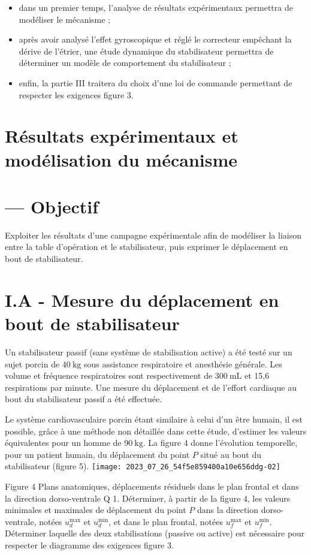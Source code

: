 \begin{itemize}
  \item dans un premier temps, l'analyse de résultats expérimentaux permettra de modéliser le mécanisme ;

  \item après avoir analysé l'effet gyroscopique et réglé le correcteur empêchant la dérive de l'étrier, une étude dynamique du stabilisateur permettra de déterminer un modèle de comportement du stabilisateur ;

  \item enfin, la partie III traitera du choix d'une loi de commande permettant de respecter les exigences figure 3.

\end{itemize}

\section{Résultats expérimentaux et modélisation du mécanisme}
\section{— Objectif}
Exploiter les résultats d'une campagne expérimentale afin de modéliser la liaison entre la table d'opération et le stabilisateur, puis exprimer le déplacement en bout de stabilisateur.

\section{I.A - Mesure du déplacement en bout de stabilisateur}
Un stabilisateur passif (sans système de stabilisation active) a été testé sur un sujet porcin de $40 \mathrm{~kg}$ sous assistance respiratoire et anesthésie générale. Les volume et fréquence respiratoires sont respectivement de $300 \mathrm{~mL}$ et 15,6 respirations par minute. Une mesure du déplacement et de l'effort cardiaque au bout du stabilisateur passif a été effectuée.

Le système cardiovasculaire porcin étant similaire à celui d'un être humain, il est possible, grâce à une méthode non détaillée dans cette étude, d'estimer les valeurs équivalentes pour un homme de $90 \mathrm{~kg}$. La figure 4 donne l'évolution temporelle, pour un patient humain, du déplacement du point $P$ situé au bout du stabilisateur (figure 5).
\texttt{[image: 2023\_07\_26\_54f5e859400a10e656ddg-02]}

Figure 4 Plans anatomiques, déplacements résiduels dans le plan frontal et dans la direction dorso-ventrale Q 1. Déterminer, à partir de la figure 4, les valeurs minimales et maximales de déplacement du point $P$ dans la direction dorso-ventrale, notées $u_{d}^{\max }$ et $u_{d}^{\min }$, et dans le plan frontal, notées $u_{f}^{\max }$ et $u_{f}^{\min }$. Déterminer laquelle des deux stabilisations (passive ou active) est nécessaire pour respecter le diagramme des exigences figure 3.

